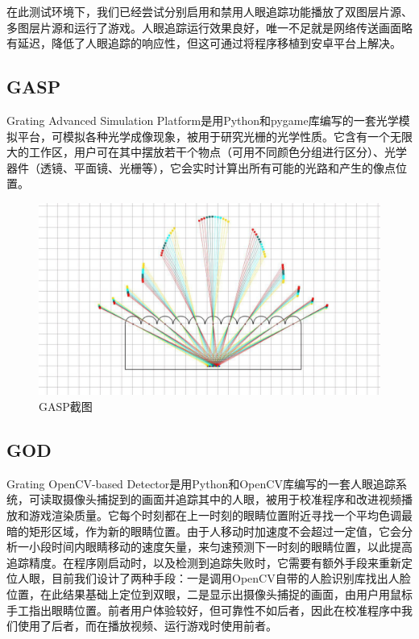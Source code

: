 \documentclass[12pt,a4paper]{article}
\begin{document}
在此测试环境下，我们已经尝试分别启用和禁用人眼追踪功能播放了双图层片源、多图层片源和运行了游戏。人眼追踪运行效果良好，唯一不足就是网络传送画面略有延迟，降低了人眼追踪的响应性，但这可通过将程序移植到安卓平台上解决。

\subsection{GASP}

Grating Advanced Simulation Platform是用Python和pygame库编写的一套光学模拟平台，可模拟各种光学成像现象，被用于研究光栅的光学性质。它含有一个无限大的工作区，用户可在其中摆放若干个物点（可用不同颜色分组进行区分）、光学器件（透镜、平面镜、光栅等），它会实时计算出所有可能的光路和产生的像点位置。

\begin{figure}[H]
    \centering
    \includegraphics[width=0.8\linewidth]{gasp}
    \caption{GASP截图}
\end{figure}



\subsection{GOD}

Grating OpenCV-based Detector是用Python和OpenCV库编写的一套人眼追踪系统，可读取摄像头捕捉到的画面并追踪其中的人眼，被用于校准程序和改进视频播放和游戏渲染质量。它每个时刻都在上一时刻的眼睛位置附近寻找一个平均色调最暗的矩形区域，作为新的眼睛位置。由于人移动时加速度不会超过一定值，它会分析一小段时间内眼睛移动的速度矢量，来匀速预测下一时刻的眼睛位置，以此提高追踪精度。在程序刚启动时，以及检测到追踪失败时，它需要有额外手段来重新定位人眼，目前我们设计了两种手段：一是调用OpenCV自带的人脸识别库找出人脸位置，在此结果基础上定位到双眼，二是显示出摄像头捕捉的画面，由用户用鼠标手工指出眼睛位置。前者用户体验较好，但可靠性不如后者，因此在校准程序中我们使用了后者，而在播放视频、运行游戏时使用前者。
\end{document}

